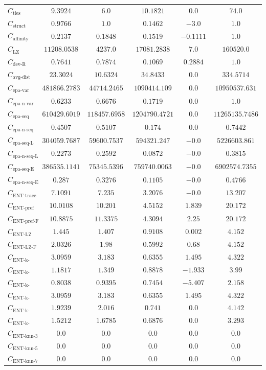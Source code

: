 \documentclass{standalone}
\newcommand{\numberoftiesname}{\text{ties}}
\newcommand{\numberofties}{C_{\numberoftiesname}}
\newcommand{\lempelzivname}{\text{LZ}}
\newcommand{\lempelziv}{C_{\lempelzivname}}
\newcommand{\structurename}{\text{struct}}
\newcommand{\structure}{C_{\structurename}}
\newcommand{\affinityname}{\text{affinity}}
\newcommand{\affinity}{C_{\affinityname}}
\newcommand{\deviationfromrandomname}{\text{dev-R}}
\newcommand{\deviationfromrandom}{C_{\deviationfromrandomname}}
\newcommand{\avgdistname}{\text{avg-dist}}
\newcommand{\avgdist}{C_{\avgdistname}}
\newcommand{\enttracename}{\text{ENT-trace}}
\newcommand{\enttrace}{C_{\enttracename}}
\newcommand{\entprefixname}{\text{ENT-pref}}
\newcommand{\entprefix}{C_{\entprefixname}}
\newcommand{\entprefixflatname}{\text{ENT-pref-F}}
\newcommand{\entprefixflat}{C_{\entprefixflatname}}
\newcommand{\entlempelzivname}{\text{ENT-LZ}}
\newcommand{\entlempelziv}{C_{\entlempelzivname}}
\newcommand{\entlempelzivflatname}{\text{ENT-LZ-F}}
\newcommand{\entlempelzivflat}{C_{\entlempelzivflatname}}
\newcommand{\entkblockdonename}{\text{ENT-k-block-d1}}
\newcommand{\entkblockdone}{C_{\entkblockdonename}}
\newcommand{\entkblockdthreename}{\text{ENT-k-block-d3}}
\newcommand{\entkblockdthree}{C_{\entkblockdthreename}}
\newcommand{\entkblockdfivename}{\text{ENT-k-block-d5}}
\newcommand{\entkblockdfive}{C_{\entkblockdfivename}}
\newcommand{\entkblockronename}{\text{ENT-k-block-r1}}
\newcommand{\entkblockrone}{C_{\entkblockronename}}
\newcommand{\entkblockrthreename}{\text{ENT-k-block-r3}}
\newcommand{\entkblockrthree}{C_{\entkblockrthreename}}
\newcommand{\entkblockrfivename}{\text{ENT-k-block-r5}}
\newcommand{\entkblockrfive}{C_{\entkblockrfivename}}
\newcommand{\entknnthreename}{\text{ENT-knn-3}}
\newcommand{\entknnthree}{C_{\entknnthreename}}
\newcommand{\entknnfivename}{\text{ENT-knn-5}}
\newcommand{\entknnfive}{C_{\entknnfivename}}
\newcommand{\entknnsevenname}{\text{ENT-knn-7}}
\newcommand{\entknnseven}{C_{\entknnsevenname}}
\newcommand{\epavariantname}{\text{epa-var}}
\newcommand{\epavariant}{C_{\epavariantname}}
\newcommand{\epanormvariantname}{\text{epa-n-var}}
\newcommand{\epanormvariant}{C_{\epanormvariantname}}
\newcommand{\epasequencename}{\text{epa-seq}}
\newcommand{\epasequence}{C_{\epasequencename}}
\newcommand{\epanormsequencename}{\text{epa-n-seq}}
\newcommand{\epanormsequence}{C_{\epanormsequencename}}
\newcommand{\epasequencelname}{\text{epa-seq-L}}
\newcommand{\epasequencel}{C_{\epasequencelname}}
\newcommand{\epanormsequencelname}{\text{epa-n-seq-L}}
\newcommand{\epanormsequencel}{C_{\epanormsequencelname}}
\newcommand{\epasequenceename}{\text{epa-seq-E}}
\newcommand{\epasequencee}{C_{\epasequenceename}}
\newcommand{\epanormsequenceename}{\text{epa-n-seq-E}}
\newcommand{\epanormsequencee}{C_{\epanormsequenceename}}
\begin{document}
\begin{tabular}{lccccc}
$\numberofties$ & $9.3924$ & $6.0$ & $10.1821$ & $0.0$ & $74.0$ \\ 
$\structure$ & $0.9766$ & $1.0$ & $0.1462$ & $-3.0$ & $1.0$ \\ 
$\affinity$ & $0.2137$ & $0.1848$ & $0.1519$ & $-0.1111$ & $1.0$ \\ 
$\lempelziv$ & $11208.0538$ & $4237.0$ & $17081.2838$ & $7.0$ & $160520.0$ \\ 
$\deviationfromrandom$ & $0.7641$ & $0.7874$ & $0.1069$ & $0.2884$ & $1.0$ \\ 
$\avgdist$ & $23.3024$ & $10.6324$ & $34.8433$ & $0.0$ & $334.5714$ \\ 
$\epavariant$ & $481866.2783$ & $44714.2465$ & $1090414.109$ & $0.0$ & $10950537.631$ \\ 
$\epanormvariant$ & $0.6233$ & $0.6676$ & $0.1719$ & $0.0$ & $1.0$ \\ 
$\epasequence$ & $610429.6019$ & $118457.6958$ & $1204790.4721$ & $0.0$ & $11265135.7486$ \\ 
$\epanormsequence$ & $0.4507$ & $0.5107$ & $0.174$ & $0.0$ & $0.7442$ \\ 
$\epasequencel$ & $304059.7687$ & $59600.7537$ & $594321.247$ & $-0.0$ & $5226603.861$ \\ 
$\epanormsequencel$ & $0.2273$ & $0.2592$ & $0.0872$ & $-0.0$ & $0.3815$ \\ 
$\epasequencee$ & $386535.1141$ & $75345.5396$ & $759740.0063$ & $-0.0$ & $6902574.7355$ \\ 
$\epanormsequencee$ & $0.287$ & $0.3276$ & $0.1105$ & $-0.0$ & $0.4766$ \\ 
$\enttrace$ & $7.1091$ & $7.235$ & $3.2076$ & $-0.0$ & $13.207$ \\ 
$\entprefix$ & $10.0108$ & $10.201$ & $4.5152$ & $1.839$ & $20.172$ \\ 
$\entprefixflat$ & $10.8875$ & $11.3375$ & $4.3094$ & $2.25$ & $20.172$ \\ 
$\entlempelziv$ & $1.445$ & $1.407$ & $0.9108$ & $0.002$ & $4.152$ \\ 
$\entlempelzivflat$ & $2.0326$ & $1.98$ & $0.5992$ & $0.68$ & $4.152$ \\ 
$\entkblockdone$ & $3.0959$ & $3.183$ & $0.6355$ & $1.495$ & $4.322$ \\ 
$\entkblockdthree$ & $1.1817$ & $1.349$ & $0.8878$ & $-1.933$ & $3.99$ \\ 
$\entkblockdfive$ & $0.8038$ & $0.9395$ & $0.7454$ & $-5.407$ & $2.158$ \\ 
$\entkblockrone$ & $3.0959$ & $3.183$ & $0.6355$ & $1.495$ & $4.322$ \\ 
$\entkblockrthree$ & $1.9239$ & $2.016$ & $0.741$ & $0.0$ & $4.142$ \\ 
$\entkblockrfive$ & $1.5212$ & $1.6785$ & $0.6876$ & $0.0$ & $3.293$ \\ 
$\entknnthree$ & $0.0$ & $0.0$ & $0.0$ & $0.0$ & $0.0$ \\ 
$\entknnfive$ & $0.0$ & $0.0$ & $0.0$ & $0.0$ & $0.0$ \\ 
$\entknnseven$ & $0.0$ & $0.0$ & $0.0$ & $0.0$ & $0.0$ \\ 
\bottomrule
\end{tabular}
\end{document}
